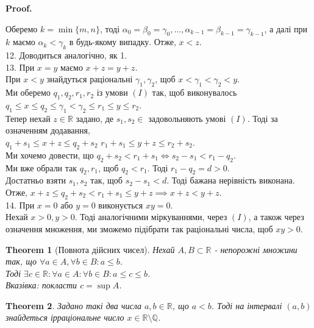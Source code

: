 \documentclass[a4paper, 14pt]{article}
\makeatletter
\def\qed{$\blacksquare$}
\theoremstyle{theoremdd}
\newtheorem{theorem}{Theorem}[subsection]
\theoremstyle{theoremdd}
\theoremstyle{theoremdd}
\theoremstyle{theoremdd}
\theoremstyle{theoremdd}
\theoremstyle{theoremdd}
\theoremstyle{theoremdd}
\theoremstyle{theoremdd}
\renewenvironment{proof}[1][Proof.\\]{\par
\pushQED{\hfill \qed}%
\normalfont \topsep6\p@\@plus6\p@\relax
\trivlist
\item\relax
{\bfseries
#1\@addpunct{.}}\hspace\labelsep\ignorespaces
}{%
\popQED\endtrivlist\@endpefalse
}
\makeatother
\begin{document}
\begin{proof}
	Оберемо $k = \min \{m,n\}$, тоді $\alpha_0 = \beta_0 = \gamma_0, \dots, \alpha_{k-1} = \beta_{k-1} = \gamma_{k-1}$, а далі при $k$ маємо $\alpha_k < \gamma_k$ в будь-якому випадку. Отже, $x < z$.
	\bigskip \\
	12. Доводиться аналогічно, як 1.
	\bigskip \\
	13. При $x = y$ маємо $x + z = y + z$.\\
	При $x < y$ знайдуться раціональні $\gamma_1, \gamma_2$, щоб $x < \gamma_1 < \gamma_2 < y$.\\
	Ми оберемо $q_1,q_2,r_1,r_2$ із умови $(I)$ так, щоб виконувалось\\
	$q_1 \leq x \leq q_2 \leq \gamma_1 < \gamma_2 \leq r_1 \leq y \leq r_2$.\\
	Тепер нехай $z \in \mathbb{R}$ задано, де $s_1,s_2 \in$ задовольняють умові $(I)$. Тоді за означенням додавання,\\
	$q_1 + s_1 \leq x + z \leq q_2 + s_2$ \quad $r_1 + s_1 \leq y + z \leq r_2 + s_2$.\\
	Ми хочемо довести, що $q_2 + s_2 < r_1 + s_1 \iff s_2 - s_1 < r_1 - q_2$.\\
	Ми вже обрали так $q_2, r_1$, щоб $q_2 < r_1$. Тоді $r_1 - q_2 = d > 0$.\\
	Достатньо взяти $s_1,s_2$ так, щоб $s_2 - s_1 < d$. Тоді бажана нерівність виконана.\\
	Отже, $x + z \leq q_2 + s_2 < r_1 + s_1 \leq y + z \implies x + z < y + z$.
	\bigskip \\
	14. При $x = 0$ або $y = 0$ виконується $xy = 0$.\\
	Нехай $x > 0, y > 0$. Тоді аналогічними міркуваннями, через $(I)$, а також через означення множення, ми зможемо підібрати так раціональні числа, щоб $xy > 0$.
	\end{proof}
	
	\begin{theorem}[Повнота дійсних чисел]
	Нехай $A,B \subset \mathbb{R}$ - непорожні множини так, що $\forall a \in A, \forall b \in B: a \leq b$.\\
	Тоді $\exists c \in \mathbb{R}: \forall a \in A: \forall b \in B: a \leq c \leq b$.\\
	\textit{Вказівка: покласти $c = \sup A$.}
	\end{theorem}
	
	\begin{theorem}
	Задано такі два числа $a,b \in \mathbb{R}$, що $a < b$. Тоді на інтервалі $(a,b)$ знайдеться ірраціональне число $x \in \mathbb{R} \setminus \mathbb{Q}$.
	\end{theorem}
	
\end{document}
